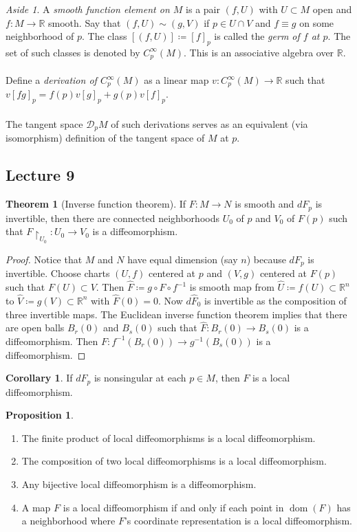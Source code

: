 \documentclass[10pt,letterpaper,cm]{nupset}
\theoremstyle{definition}
\theoremstyle{theorem}
\newtheorem{theorem}[definition]{Theorem}
\newtheorem{prop}[definition]{Proposition}
\newtheorem{corollary}[definition]{Corollary}
\theoremstyle{remark}
\newtheorem*{aside}{Aside}
\newcommand{\R}{\mathbb R}
\newcommand{\1}{\mathbf{1}}
\newcommand{\0}{\vec 0}
\DeclareMathOperator{\dom}{dom}
\begin{document}
\begin{aside}
A \textit{smooth function element on $M$} is a pair $(f, U)$ with $U\subset M$ open and $f: M \to \R$ smooth. Say that $(f, U) \sim (g, V)$ if $p\in U \cap V$ and $f \equiv g$ on some neighborhood of $p$. The class $[(f, U)]\coloneqq [f]_p$ is called the \textit{germ of $f$ at $p$}. The set of such classes is denoted by $C^{\infty}_p(M)$. This is an associative algebra over $\R$. \\ \\ Define a \textit{derivation of $C^{\infty}_p(M)$} as a linear map $v: C^{\infty}_p(M) \to \R$ such that $v[fg]_p = f(p)v[g]_p+g(p)v[f]_p$.  \\ \\ The tangent space $\mathcal{D}_pM$ of such derivations serves as an equivalent (via isomorphism) definition of the tangent space of $M$ at $p$.
\end{aside}

\subsection{Lecture 9}

\begin{theorem}[Inverse function theorem]
If $F: M \to N$ is smooth and $dF_p$ is invertible, then there are connected neighborhoods  $U_0$ of $p$ and $V_0$ of $F(p)$ such that $F\restriction_{U_0}: U_0 \to V_0$ is a diffeomorphism.
\end{theorem}
\begin{proof}
Notice that $M$ and $N$ have equal dimension (say $n$) because $dF_p$ is invertible. Choose charts $(U, f)$ centered at $p$ and $(V, g)$ centered at $F(p)$ such that $F(U) \subset V$. Then $\widehat{F}\coloneqq  g \circ F \circ f^{-1}$ is smooth map from $\widehat{U}\coloneqq f(U)\subset \R^n$ to $\widehat{V}\coloneqq g(V)\subset \R^n$ with $\widehat{F}(0) =0$. Now $d\widehat{F}_0$ is invertible as the composition of three invertible maps. The Euclidean inverse function theorem implies that there are open balls $B_{r}(0)$ and $B_s(0)$ such that $\widehat{F} : B_r(0) \to B_s(0)$ is a diffeomorphism. Then $F: f^{-1}(B_r(0)) \to g^{-1}(B_s(0))$ is a diffeomorphism.
\end{proof}

\begin{corollary}
If $dF_p$ is nonsingular at each $p\in M$, then $F$ is a local diffeomorphism.
\end{corollary}

\begin{prop} $ $
\begin{enumerate}
\item The finite product of local diffeomorphisms is a local diffeomorphism.
\item The composition of two local diffeomorphisms is a local diffeomorphism.
\item Any bijective local diffeomorphism is a diffeomorphism.
\item A map $F$ is a local diffeomorphism if and only if each point in $\dom(F)$ has a neighborhood where $F$'s coordinate representation is a local diffeomorphism.
\end{enumerate}
\end{prop}
\end{document}
